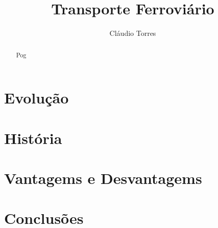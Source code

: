 \documentclass{report}
\author{Cl\'audio Torres}
\title{Transporte Ferroviário}
\begin{document}
\maketitle
\section{Evolu\c c\~ao}
\section{Hist\'oria}
\section{Vantagems e Desvantagems}
\section{Conclus\~oes}
\begin{abstract}
  Pog
\end{abstract}
\end{document}
